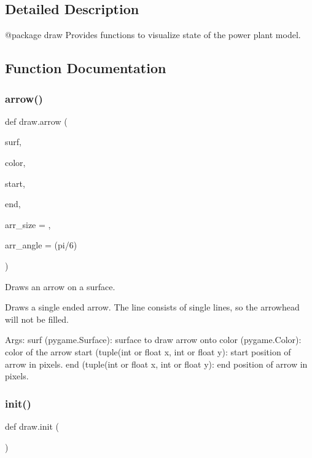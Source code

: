 \subsection{Detailed Description}
\begin{DoxyVerb}@package draw
Provides functions to visualize state of the power plant model.\end{DoxyVerb}
 

\subsection{Function Documentation}
\mbox{\label{namespacedraw_afd81ee7eb842130bdb8f43065d2df27a}} 
\subsubsection{\texorpdfstring{arrow()}{arrow()}}
{\footnotesize\ttfamily def draw.\+arrow (\begin{DoxyParamCaption}\item[{}]{surf,  }\item[{}]{color,  }\item[{}]{start,  }\item[{}]{end,  }\item[{}]{arr\+\_\+size = {},  }\item[{}]{arr\+\_\+angle = {\ttfamily (pi/6)} }\end{DoxyParamCaption})}

\begin{DoxyVerb}Draws an arrow on a surface.

Draws a single ended arrow. The line consists of single lines, so the
arrowhead will not be filled.

Args:
    surf (pygame.Surface): surface to draw arrow onto
    color (pygame.Color): color of the arrow
    start (tuple(int or float x, int or float y): start position of
        arrow in pixels.
    end (tuple(int or float x, int or float y): end position of
        arrow in pixels.\end{DoxyVerb}
 \mbox{\label{namespacedraw_a8faeca448048936cb5bc781a47a0198a}} 
\subsubsection{\texorpdfstring{init()}{init()}}
{\footnotesize\ttfamily def draw.\+init (\begin{DoxyParamCaption}{ }\end{DoxyParamCaption})}

